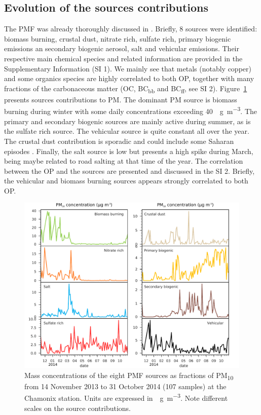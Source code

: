 \documentclass[acp, manuscript]{copernicus}
\begin{document}
\subsection{Evolution of the sources contributions}\label{evolution-of-the-sources-contributions}

The PMF was already thoroughly discussed in \citet{chevrier_chauffage_2016}. Briefly, 8
sources were identified: biomass burning, crustal dust, nitrate rich,
sulfate rich, primary biogenic emissions an secondary biogenic aerosol, salt and
vehicular emissions. Their respective main chemical species and related
information are provided in the Supplementary Information (SI 1). We
mainly see that metals (notably copper) and some organics species are
highly correlated to both OP, together with many fractions of the
carbonaceous matter (OC, BC\textsubscript{bb} and BC\textsubscript{ff}, see SI 2).
Figure~\ref{fig:PMFsrc} presents sources contributions to PM. The dominant PM
source is biomass burning during winter with some daily concentrations
exceeding 40~\unit{\mu g~m^{-3}}. The primary and secondary
biogenic sources are mainly active during summer, as is the sulfate
rich source. The vehicular source is quite constant all over the year. The
crustal dust contribution is sporadic and could include some Saharan
episodes \citep{aymoz_evolution_2004}. Finally, the salt source is low but
presents a high spike during March, being maybe related to road salting
at that time of the year. The correlation between the OP and the sources
are presented and discussed in the SI 2. Briefly, the vehicular and
biomass burning sources appears strongly correlated to both OP.

\begin{figure}[h]
    \centering
    \includegraphics[width=\textwidth]{figures/fig03}
    \caption{Mass concentrations of the eight PMF sources as fractions of PM\textsubscript{10} from 14 November 2013 to 31 October 2014 (107 samples)
at the Chamonix station. Units are expressed in~\unit{\mu g~m^{-3}}. Note
different scales on the source contributions.  }
    \label{fig:PMFsrc}
\end{figure}
\end{document}
